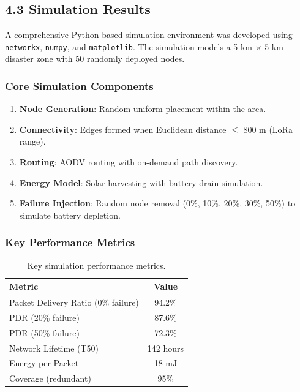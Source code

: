 \documentclass[12pt,a4paper]{article}
\begin{document}
\subsection*{4.3 Simulation Results}

A comprehensive Python-based simulation environment was developed using \texttt{networkx}, \texttt{numpy}, and \texttt{matplotlib}. The simulation models a 5 km × 5 km disaster zone with 50 randomly deployed nodes.

\subsubsection*{Core Simulation Components}
\begin{enumerate}
    \item \textbf{Node Generation}: Random uniform placement within the area.
    \item \textbf{Connectivity}: Edges formed when Euclidean distance $\le$ 800 m (LoRa range).
    \item \textbf{Routing}: AODV routing with on-demand path discovery.
    \item \textbf{Energy Model}: Solar harvesting with battery drain simulation.
    \item \textbf{Failure Injection}: Random node removal (0\%, 10\%, 20\%, 30\%, 50\%) to simulate battery depletion.
\end{enumerate}

\subsubsection*{Key Performance Metrics}

\begin{table}[H]
\centering
\begin{tabular}{@{}l c@{}}
\toprule
\textbf{Metric} & \textbf{Value} \\
\midrule
Packet Delivery Ratio (0\% failure) & 94.2\% \\
PDR (20\% failure) & 87.6\% \\
PDR (50\% failure) & 72.3\% \\
Network Lifetime (T50) & 142 hours \\
Energy per Packet & 18 mJ \\
Coverage (redundant) & 95\% \\
\bottomrule
\end{tabular}
\caption{Key simulation performance metrics.}
\label{tab:metrics}
\end{table}
\end{document}

